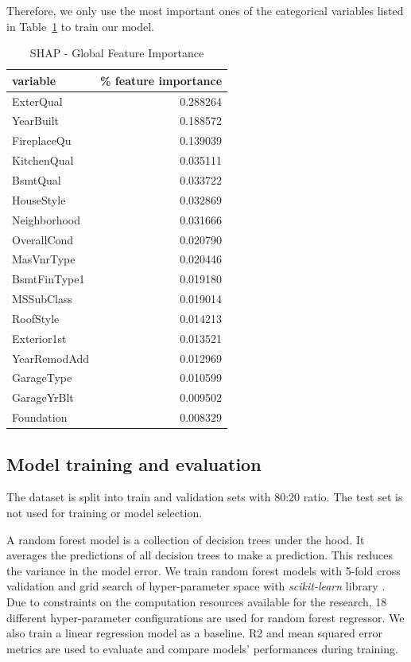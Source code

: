\documentclass[conference]{IEEEtran}
\begin{document}
Therefore, we only use the most important ones of the categorical variables 
listed in Table~\ref{table:shap-global-feature-importance} to train our model.
\begin{table}[htbp]
    \caption{SHAP - Global Feature Importance}
\begin{center}
\begin{tabular}{lr}
    \hline
        variable &  \% feature importance \\
    \hline
       ExterQual &    0.288264 \\
       YearBuilt &    0.188572 \\
     FireplaceQu &    0.139039 \\
     KitchenQual &    0.035111 \\
        BsmtQual &    0.033722 \\
      HouseStyle &    0.032869 \\
    Neighborhood &    0.031666 \\
     OverallCond &    0.020790 \\
      MasVnrType &    0.020446 \\
    BsmtFinType1 &    0.019180 \\
      MSSubClass &    0.019014 \\
       RoofStyle &    0.014213 \\
     Exterior1st &    0.013521 \\
    YearRemodAdd &    0.012969 \\
      GarageType &    0.010599 \\
     GarageYrBlt &    0.009502 \\
      Foundation &    0.008329 \\
    \hline
\end{tabular}
\label{table:shap-global-feature-importance}
\end{center}
\end{table}

\subsection{Model training and evaluation}

The dataset is split into train and validation sets with 80:20 ratio. 
The test set is not used for training or model selection.

A random forest model is a collection of decision trees under the hood. 
It averages the predictions of all decision trees to make a prediction. 
This reduces the variance in the model error.
We train random forest models with 5-fold cross validation and grid search of 
hyper-parameter space with \textit{scikit-learn} library \cite{scikit-learn}. 
Due to constraints on the computation resources available for the research, 
18 different hyper-parameter configurations are used for random forest regressor. 
We also train a linear regression model as a baseline. 
R2 and mean squared error metrics are used to evaluate and compare models' performances during training. 
\end{document}
